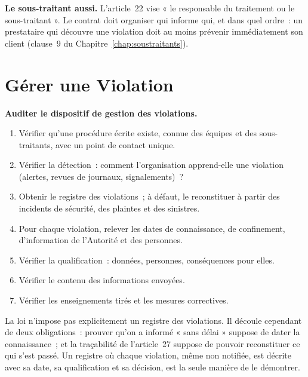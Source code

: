 \begin{boxinfo}
\textbf{Le sous-traitant aussi.} L'article~22 vise « le responsable du
traitement ou le sous-traitant ». Le contrat doit organiser qui informe
qui, et dans quel ordre~: un prestataire qui découvre une violation doit
au moins prévenir immédiatement son client (clause~9 du
Chapitre~\ref{chap:soustraitants}).
\end{boxinfo}

\section{Gérer une Violation}
\label{sec:c12-gerer}

\begin{boxprocedure}
\textbf{Auditer le dispositif de gestion des violations.}
\begin{enumerate}
    \item Vérifier qu'une procédure écrite existe, connue des équipes et des
          sous-traitants, avec un point de contact unique.
    \item Vérifier la détection~: comment l'organisation apprend-elle une
          violation (alertes, revues de journaux, signalements)~?
    \item Obtenir le registre des violations~; à défaut, le reconstituer à
          partir des incidents de sécurité, des plaintes et des sinistres.
    \item Pour chaque violation, relever les dates de connaissance, de
          confinement, d'information de l'Autorité et des personnes.
    \item Vérifier la qualification~: données, personnes, conséquences
          pour elles.
    \item Vérifier le contenu des informations envoyées.
    \item Vérifier les enseignements tirés et les mesures correctives.
\end{enumerate}
\end{boxprocedure}

La loi n'impose pas explicitement un registre des violations. Il découle
cependant de deux obligations~: prouver qu'on a informé « sans délai »
suppose de dater la connaissance~; et la traçabilité de l'article~27
suppose de pouvoir reconstituer ce qui s'est passé. Un registre où chaque
violation, même non notifiée, est décrite avec sa date, sa qualification
et sa décision, est la seule manière de le démontrer.

